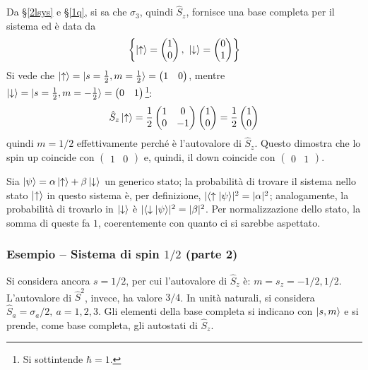 \documentclass[11pt, a4paper]{scrartcl} %
\numberwithin{equation}{subsection}
\theoremstyle{style2}
\theoremstyle{style1}
\begin{document}
Da \S\ref{2lsys} e \S\ref{1q}, si sa che $\sigma _3$, quindi $\hat{S}_z$, fornisce una base completa per il sistema ed \`e data da
\[
\left\{ \ket{\uparrow} = \begin{pmatrix} 1 \\ 0 \end{pmatrix} , \ \ket{\downarrow} = \begin{pmatrix} 0 \\ 1 \end{pmatrix}  \right\} 
\] 
Si vede che $\ket{\uparrow} = \ket{s=\frac{1}{2}, m= \frac{1}{2}}=\begin{pmatrix} 1 & 0  \end{pmatrix}  $, mentre $\ket{\downarrow} = \ket{s=\frac{1}{2}, m = - \frac{1}{2}} = \begin{pmatrix} 0 &  1 \end{pmatrix} $\footnote{Si sottintende $\hbar = 1$.}:
\[
	\hat{S}_z \ket{\uparrow} = \frac{1}{2} \begin{pmatrix} 1 & 0 \\0 & -1 \end{pmatrix} \begin{pmatrix} 1 \\ 0  \end{pmatrix} = \frac{1}{2} \begin{pmatrix} 1 \\ 0 \end{pmatrix} 
\] 
quindi $m = 1 / 2$ effettivamente perch\'e \`e l'autovalore di $\hat{S}_z$. 
Questo dimostra che lo spin up coincide con $\begin{pmatrix} 1 & 0 \end{pmatrix} $ e, quindi, il down coincide con $\begin{pmatrix} 0 & 1 \end{pmatrix} $.

Sia $\ket{\psi } =  \alpha  \ket{\uparrow} + \beta \ket{\downarrow} $ un generico stato; la probabilit\`a di trovare il sistema nello stato $\ket{\uparrow} $ in questo sistema \`e, per definizione, $\lvert \braket{\uparrow|\psi }  \rvert ^2 = \lvert \alpha  \rvert ^2$; analogamente, la probabilit\`a di trovarlo in $\ket{\downarrow} $ \`e $\lvert \braket{\downarrow|\psi }  \rvert ^2 = \lvert \beta  \rvert ^2$. 
Per normalizzazione dello stato, la somma di queste fa $1$, coerentemente con quanto ci si sarebbe aspettato.

\subsubsection{Esempio -- Sistema di spin $ 1 / 2$ (parte 2)}
Si considera ancora $s = 1 / 2$, per cui l'autovalore di $\hat{S}_z$ \`e: $m=s_z = -1 / 2 ,  1 / 2$. L'autovalore di $\hat{S}^2$, invece, ha valore $3 / 4$.
In unit\`a naturali, si considera $\hat{S}_a = \sigma _a / 2, \ a = 1 ,2 ,3 $.
Gli elementi della base completa si indicano con $\ket{s,m} $ e si prende, come base completa, gli autostati di $\hat{S}_z$.
\end{document}
